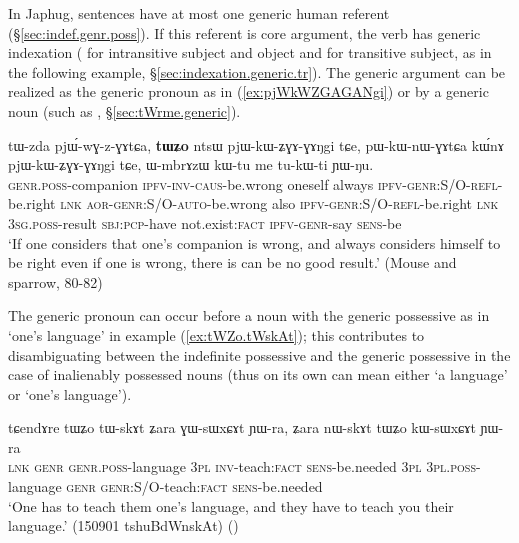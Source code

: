 In Japhug, sentences have at most one generic human referent (§\ref{sec:indef.genr.poss}). If this referent is core argument, the verb has generic indexation ( for intransitive subject and object and  for transitive subject, as in the following example, §\ref{sec:indexation.generic.tr}). The generic argument can be realized as the generic pronoun  as in (\ref{ex:pjWkWZGAGANgi}) or by a generic noun (such as , §\ref{sec:tWrme.generic}).

\begin{exe}
\ex \label{ex:pjWkWZGAGANgi}
\gll tɯ-zda pjɯ́-wɣ-z-ɣɤtɕa, \textbf{tɯʑo} ntsɯ pjɯ-kɯ-ʑɣɤ-ɣɤŋgi tɕe, pɯ-kɯ-nɯ-ɣɤtɕa kɯ́nɤ pjɯ-kɯ-ʑɣɤ-ɣɤŋgi tɕe, ɯ-mbrɤzɯ kɯ-tu me tu-kɯ-ti ɲɯ-ŋu.   \\
\textsc{genr}.\textsc{poss}-companion \textsc{ipfv}-\textsc{inv}-\textsc{caus}-be.wrong oneself always \textsc{ipfv}-\textsc{genr}:S/O-\textsc{refl}-be.right \textsc{lnk} \textsc{aor}-\textsc{genr}:S/O-\textsc{auto}-be.wrong also \textsc{ipfv}-\textsc{genr}:S/O-\textsc{refl}-be.right \textsc{lnk} \textsc{3sg}.\textsc{poss}-result \textsc{sbj}:\textsc{pcp}-have  not.exist:\textsc{fact} \textsc{ipfv}-\textsc{genr}-say \textsc{sens}-be \\
\glt  `If one considers that one's companion is wrong, and always considers himself to be right even if one is wrong, there is can be no good result.' (Mouse and sparrow, 80-82)
\end{exe} 

The generic pronoun can occur before a noun with the generic possessive as in   `one's language' in example (\ref{ex:tWZo.tWskAt}); this contributes to disambiguating between the indefinite possessive and the generic possessive in the case of inalienably possessed nouns (thus on its own  can mean either `a language' or `one's language').

\begin{exe}
\ex \label{ex:tWZo.tWskAt}
\gll tɕendɤre tɯʑo tɯ-skɤt ʑara ɣɯ-sɯxɕɤt ɲɯ-ra, ʑara nɯ-skɤt tɯʑo kɯ-sɯxɕɤt ɲɯ-ra \\
\textsc{lnk} \textsc{genr} \textsc{genr}.\textsc{poss}-language \textsc{3pl} \textsc{inv}-teach:\textsc{fact} \textsc{sens}-be.needed \textsc{3pl} \textsc{3pl}.\textsc{poss}-language \textsc{genr} \textsc{genr}:S/O-teach:\textsc{fact} \textsc{sens}-be.needed \\
\glt `One has to teach them one's language, and they have to teach you their language.'  (150901 tshuBdWnskAt)
()
\end{exe} 

